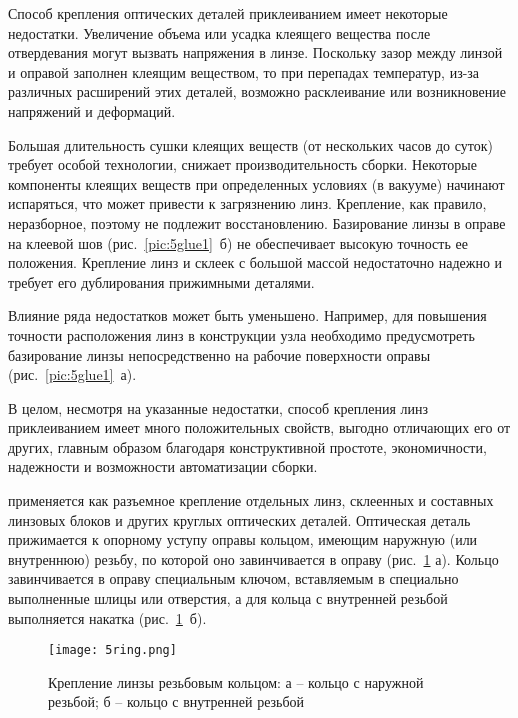 Способ крепления оптических деталей приклеиванием имеет некоторые недостатки. 
Увеличение объема или усадка клеящего вещества после отвердевания могут вызвать напряжения в линзе. 
Поскольку зазор между линзой и оправой заполнен клеящим веществом, то при перепадах температур, из-за различных расширений этих деталей, возможно расклеивание или возникновение напряжений и деформаций. 

Большая длительность сушки клеящих веществ (от нескольких часов до суток) требует особой технологии, снижает производительность сборки. 
Некоторые компоненты клеящих веществ при определенных условиях (в вакууме) начинают испаряться, что может привести к загрязнению линз. 
Крепление, как правило, неразборное, поэтому не подлежит восстановлению. 
Базирование линзы в оправе на клеевой шов (рис.~\ref{pic:5glue1}~б) не обеспечивает высокую точность ее положения. 
Крепление линз и склеек с большой массой недостаточно надежно и требует его дублирования прижимными деталями.

Влияние ряда недостатков может быть уменьшено. 
Например, для повышения точности расположения линз в конструкции узла необходимо предусмотреть базирование линзы непосредственно на рабочие поверхности оправы (рис.~\ref{pic:5glue1}~а). 

В целом, несмотря на указанные недостатки, способ крепления линз приклеиванием имеет много положительных свойств, выгодно отличающих его от других, главным образом благодаря конструктивной простоте, экономичности, надежности и возможности автоматизации сборки.

 применяется как разъемное крепление отдельных линз, склеенных и составных линзовых блоков и других круглых оптических деталей. 
Оптическая деталь прижимается к опорному уступу оправы кольцом, имеющим наружную (или внутреннюю) резьбу, по которой оно завинчивается в оправу (рис.~\ref{pic:5ring} а). 
Кольцо завинчивается в оправу специальным ключом, вставляемым в специально выполненные шлицы или отверстия, а для кольца с внутренней резьбой выполняется накатка (рис.~\ref{pic:5ring}~б).

\begin{figure}[h!]
	\begin{center}
		\texttt{[image: 5ring.png]}
		\label{pic:5ring}
		\caption[Крепление линзы резьбовым кольцом]{ Крепление линзы резьбовым кольцом: а -- кольцо с наружной резьбой; б -- кольцо с внутренней резьбой}
	\end{center}
\end{figure}

